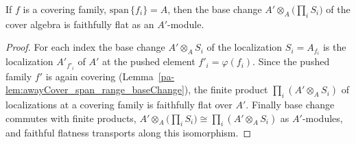 \begin{lemma}
  \label{pa-lem:awayCover_faithfullyFlat_tensor}
  \leanok

  If \(f\) is a covering family, \(\mathrm{span}\,\{f_i\} = A\), then the base change \(A'
  \otimes_A \bigl(\prod_i S_i\bigr)\) of the cover algebra is faithfully flat as an
  \(A'\)-module.
\end{lemma}
\begin{proof}
  \leanok
  For each index the base change \(A' \otimes_A S_i\) of the localization \(S_i = A_{f_i}\) is
  the localization \(A'_{f'_i}\) of \(A'\) at the pushed element \(f'_i = \varphi(f_i)\).  Since
  the pushed family \(f'\) is again covering
  (Lemma~\ref{pa-lem:awayCover_span_range_baseChange}), the finite product \(\prod_i (A' \otimes_A
  S_i)\) of localizations at a covering family is faithfully flat over \(A'\).  Finally base
  change commutes with finite products, \(A' \otimes_A \bigl(\prod_i S_i\bigr) \cong \prod_i (A'
  \otimes_A S_i)\) as \(A'\)-modules, and faithful flatness transports along this isomorphism.
\end{proof}

